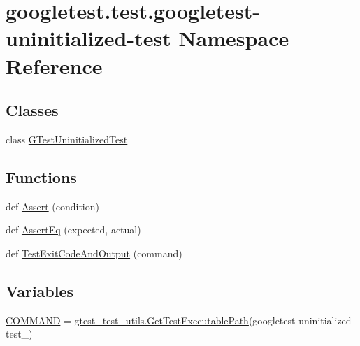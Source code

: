 \hypertarget{namespacegoogletest_1_1test_1_1googletest-uninitialized-test}{}\section{googletest.\+test.\+googletest-\/uninitialized-\/test Namespace Reference}
\label{namespacegoogletest_1_1test_1_1googletest-uninitialized-test}
\subsection*{Classes}
\begin{DoxyCompactItemize}
\item 
class \mbox{\hyperlink{classgoogletest_1_1test_1_1googletest-uninitialized-test_1_1_g_test_uninitialized_test}{G\+Test\+Uninitialized\+Test}}
\end{DoxyCompactItemize}
\subsection*{Functions}
\begin{DoxyCompactItemize}
\item 
def \mbox{\hyperlink{namespacegoogletest_1_1test_1_1googletest-uninitialized-test_a5f06058f728a559b18b86d60e08f2a9f}{Assert}} (condition)
\item 
def \mbox{\hyperlink{namespacegoogletest_1_1test_1_1googletest-uninitialized-test_af543f1fa1e8d61d8c33e0d3127d93303}{Assert\+Eq}} (expected, actual)
\item 
def \mbox{\hyperlink{namespacegoogletest_1_1test_1_1googletest-uninitialized-test_a7949e509b630fdabf66243aade024a35}{Test\+Exit\+Code\+And\+Output}} (command)
\end{DoxyCompactItemize}
\subsection*{Variables}
\begin{DoxyCompactItemize}
\item 
\mbox{\hyperlink{namespacegoogletest_1_1test_1_1googletest-uninitialized-test_a40aa089e8c55dbb2c5048c322bd1c5e1}{C\+O\+M\+M\+A\+ND}} = \mbox{\hyperlink{namespacegoogletest_1_1test_1_1gtest__test__utils_ac9af888c702350aac56b154a6af34098}{gtest\+\_\+test\+\_\+utils.\+Get\+Test\+Executable\+Path}}(\textquotesingle{}googletest-\/uninitialized-\/test\+\_\+\textquotesingle{})
\end{DoxyCompactItemize}


